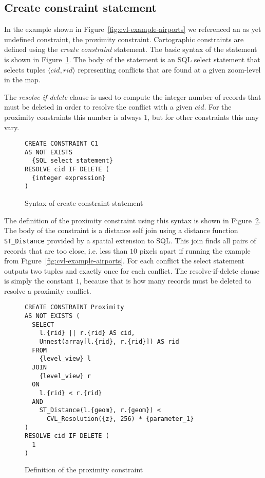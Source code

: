 \subsection{Create constraint statement}
\label{sec:create-constraint-statement}

In the example shown in Figure~\ref{fig:cvl-example-airports} we referenced an as yet undefined constraint, the proximity constraint. Cartographic constraints are defined using the \emph{create constraint} statement.  The basic syntax of the statement is shown in Figure~\ref{fig:create-constraint-syntax}. The body of the statement is an SQL select statement that selects tuples $\langle cid, rid\rangle$ representing conflicts that are found at a given zoom-level in the map.

The \emph{resolve-if-delete} clause is used to compute the integer number of records that must be deleted in order to resolve the conflict with a given $cid$. For the proximity constraints this number is always 1, but for other constraints this may vary.

\begin{figure}[htbp]
\begin{center}
\begin{lstlisting}
CREATE CONSTRAINT C1
AS NOT EXISTS
  {SQL select statement}
RESOLVE cid IF DELETE (
  {integer expression}
)
\end{lstlisting}
\caption{Syntax of create constraint statement}
\label{fig:create-constraint-syntax}
\end{center}
\end{figure}

The definition of the proximity constraint using this syntax is shown in Figure~\ref{fig:proximity-definition}. The body of the constraint is a distance self join using a distance function \texttt{ST\_Distance} provided by a spatial extension to SQL. This join finds all pairs of records that are too close, i.e. less than $10$ pixels apart if running the example from Figure~\ref{fig:cvl-example-airports}. For each conflict the select statement outputs two tuples and exactly once for each conflict. The resolve-if-delete clause is simply the constant $1$, because that is how many records must be deleted to resolve a proximity conflict.

\begin{figure}[htbp]
\begin{center}
\begin{lstlisting}
CREATE CONSTRAINT Proximity
AS NOT EXISTS (
  SELECT 
    l.{rid} || r.{rid} AS cid,
    Unnest(array[l.{rid}, r.{rid}]) AS rid
  FROM
    {level_view} l
  JOIN
    {level_view} r
  ON
    l.{rid} < r.{rid}
  AND
    ST_Distance(l.{geom}, r.{geom}) <
      CVL_Resolution({z}, 256) * {parameter_1}
)
RESOLVE cid IF DELETE (
  1
)
\end{lstlisting}
\caption{Definition of the proximity constraint}
\label{fig:proximity-definition}
\end{center}
\end{figure}

